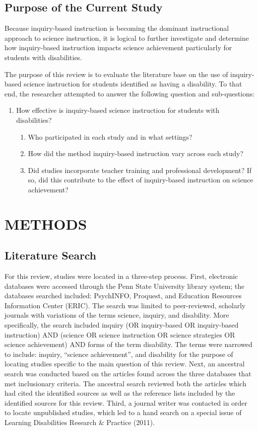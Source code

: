 \documentclass[11.5pt]{sig-alternate} %
\begin{document}
\begin{large}
\subsection*{Purpose of the Current Study}

Because inquiry-based instruction is becoming the dominant instructional approach to science instruction, it is logical to further investigate and determine how inquiry-based instruction impacts science achievement particularly for students with disabilities.

The purpose of this review is to evaluate the literature base on the use of inquiry-based science instruction for students identified as having a disability.  To that end, the researcher attempted to answer the following question and sub-questions:
\begin{enumerate}
    \item How effective is inquiry-based science instruction for students with disabilities?
\begin{enumerate} [label=(\alph*)]
    \item Who participated in each study and in what settings?
    \item How did the method inquiry-based instruction vary across each study?
    \item Did studies incorporate teacher training and professional development?  If so, did this contribute to the effect of inquiry-based instruction on science achievement?
\end{enumerate}
\end{enumerate}

\section*{METHODS}
\subsection*{Literature Search}

For this review, studies were located in a three-step process.  First, electronic databases were accessed through the Penn State University library system; the databases searched included: PsychINFO, Proquest, and Education Resources Information Center (ERIC).  The search was limited to peer-reviewed, scholarly journals with variations of the terms science, inquiry, and disability.  More specifically, the search included inquiry (OR inquiry-based OR inquiry-based instruction) AND (science OR science instruction OR science strategies OR science achievement) AND forms of the term disability.  The terms were narrowed to include: inquiry, “science achievement”, and disability for the purpose of locating studies specific to the main question of this review.  Next, an ancestral search was conducted based on the articles found across the three databases that met inclusionary criteria. The ancestral search reviewed both the articles which had cited the identified sources as well as the reference lists included by the identified sources for this review.  Third, a journal writer was contacted in order to locate unpublished studies, which led to a hand search on a special issue of Learning Disabilities Research \& Practice (2011).


\end{large}
\end{document}
